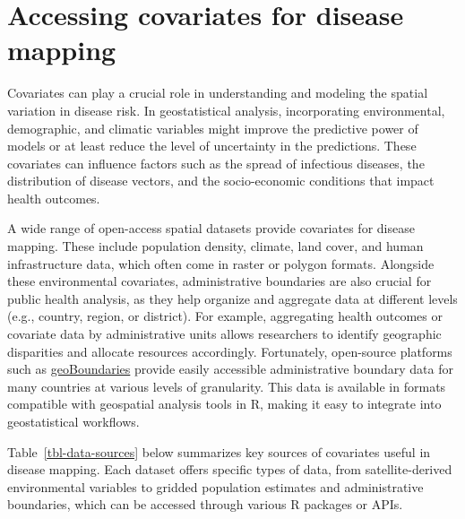 \documentclass[
  letterpaper,
]{krantz}
\begin{document}
\section{Accessing covariates for disease
mapping}\label{accessing-covariates-for-disease-mapping}

Covariates can play a crucial role in understanding and modeling the
spatial variation in disease risk. In geostatistical analysis,
incorporating environmental, demographic, and climatic variables might
improve the predictive power of models or at least reduce the level of
uncertainty in the predictions. These covariates can influence factors
such as the spread of infectious diseases, the distribution of disease
vectors, and the socio-economic conditions that impact health outcomes.

A wide range of open-access spatial datasets provide covariates for
disease mapping. These include population density, climate, land cover,
and human infrastructure data, which often come in raster or polygon
formats. Alongside these environmental covariates, administrative
boundaries are also crucial for public health analysis, as they help
organize and aggregate data at different levels (e.g., country, region,
or district). For example, aggregating health outcomes or covariate data
by administrative units allows researchers to identify geographic
disparities and allocate resources accordingly. Fortunately, open-source
platforms such as \href{https://www.geoboundaries.org/}{geoBoundaries}
provide easily accessible administrative boundary data for many
countries at various levels of granularity. This data is available in
formats compatible with geospatial analysis tools in R, making it easy
to integrate into geostatistical workflows.

Table~\ref{tbl-data-sources} below summarizes key sources of covariates
useful in disease mapping. Each dataset offers specific types of data,
from satellite-derived environmental variables to gridded population
estimates and administrative boundaries, which can be accessed through
various R packages or APIs.
\end{document}
